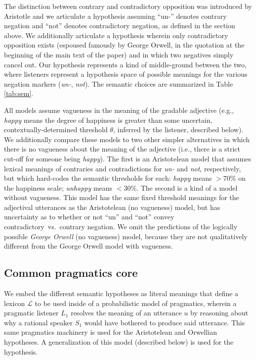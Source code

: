 \documentclass[floatsintext,doc]{apa6}
\begin{document}
The distinction between contrary and contradictory opposition was introduced by Aristotle and we articulate a hypothesis assuming ``un-'' denotes contrary negation and ``not'' denotes contradictory negation, as defined in the section above.
We additionally articulate a hypothesis wherein only contradictory opposition exists (espoused famously by George Orwell, in the quotation at the beginning of the main text of the paper) and in which two negatives simply cancel out. 
Our \ourmodel hypothesis represents a kind of middle-ground between the two, where listeners represent a hypothesis space of possible meanings for the various negation markers (\emph{un-}, \emph{not}).
The semantic choices are summarized in Table \ref{tab:sem}.

All models assume vagueness in the meaning of the gradable adjective (e.g., \emph{happy} means the degree of happiness is greater than some uncertain, contextually-determined threshold $\theta$, inferred by the listener, described below).
We additionally compare these models to two other simpler alternatives in which there is no vagueness about the meaning of the adjective (i.e., there is a strict cut-off for someone being \emph{happy}). 
The first is an Aristotelean model that assumes lexical meanings of contraries and contradictions for \emph{un-} and \emph{not}, respectively, but which hard-codes the semantic thresholds for each:  \emph{happy} means \(>70\%\) on the happiness scale; \emph{unhappy} means \(<30\%\).
The second is a kind of a \ourmodel model without vagueness. 
This model has the same fixed threshold meanings for the adjectival utterances as the Aristotelean (no vagueness) model, but has uncertainty as to whether or not ``un'' and ``not'' convey contradictory~vs.~contrary negation. 
We omit the predictions of the logically possible \emph{George Orwell} (no vagueness) model, because they are not qualitatively different from the George Orwell model with vagueness.



\subsection{Common pragmatics core}

We embed the different semantic hypotheses as literal meanings that define a lexicon $\mathcal{L}$ to be used inside of a probabilistic model of pragmatics, wherein a pragmatic listener $L_1$ resolves the meaning of an utterance $u$ by reasoning about why a rational speaker $S_1$ would have bothered to produce said utterance.
This same pragmatics machinery is used for the Aristotelean and Orwellian hypotheses. 
A generalization of this model (described below) is used for the \ourmodel hypothesis. 
\end{document}
